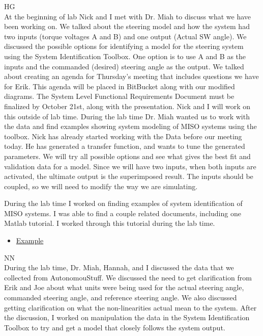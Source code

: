 \documentclass[fontsize=11pt, %
                             paper=letter, %
                             openany, %
                             captions=tableheading,
                             index=totoc,
                             hyperref]{labbook}
\def\currentYear{2021}
\begin{document}
\begin{addmargin}[0cm]{0cm}

\labday{Tuesday, October 19, \currentYear}
HG\\
At the beginning of lab Nick and I met with Dr. Miah to discuss what we have been working on. We talked about the steering model and how the system had two inputs (torque voltages A and B) and one output (Actual SW angle). We discussed the possible options for identifying a model for the steering system using the System Identification Toolbox. One option is to use A and B as  the inputs and the commanded (desired) steering angle as the output. We talked about creating an agenda for Thursday's meeting that includes questions we have for Erik. This agenda will be placed in BitBucket along with our modified diagrams. The System Level Functional Requirements Document must be finalized by October 21st, along with the presentation. Nick and I will work on this outside of lab time. During the lab time Dr. Miah wanted us to work with the data and find examples showing system modeling of MISO systems using the toolbox. Nick has already started working with the Data before our meeting today. He has generated a transfer function, and wants to tune the generated parameters. We will try all possible options and see what gives the best fit and validation data for a model. Since we will have two inputs, when both inputs are activated, the ultimate output is the superimposed result. The inputs should be coupled, so we will need to modify the way we are simulating. 

During the lab time I worked on finding examples of system identification of MISO systems. I was able to find a couple related documents, including one Matlab tutorial. I worked through this tutorial during the lab time. 
\begin{itemize}
	\item \href{https://www.mathworks.com/help/ident/gs/identify-linear-models-using-the-command-line.html}{Example}
\end{itemize}

NN\\
During the lab time, Dr. Miah, Hannah, and I discussed the data that we collected from AutonomouStuff. We discussed the need to get clarification from Erik and Joe about what units were being used for the actual steering angle, commanded steering angle, and reference steering angle. We also discussed getting clarification on what the non-linearities actual mean to the system. After the discussion, I worked on manipulation the data in the System Identification Toolbox to try and get a model that closely follows the system output. 


\end{addmargin}
\end{document}
